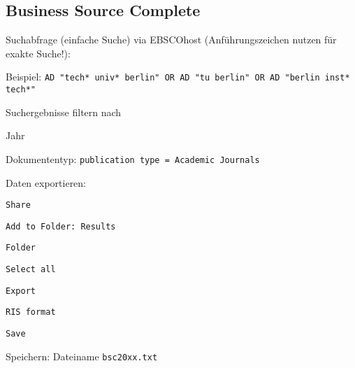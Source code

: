 \subsection*{Business Source Complete}
\begin{compactitem}
\item Suchabfrage (einfache Suche) via EBSCOhost (Anführungszeichen nutzen für exakte Suche!):
	\begin{compactitem}
	\item Beispiel: \texttt{AD "tech* univ* berlin"\ OR AD "tu berlin"\ OR AD "berlin \newline inst* tech*"}
	\end{compactitem}
\item Suchergebnisse filtern nach
	\begin{compactitem}
    \item Jahr
    \item Dokumententyp: \texttt{publication type = Academic Journals}
    \end{compactitem}
\item Daten exportieren: 
	\begin{compactitem}
	\item \texttt{Share}
    \item \texttt{Add to Folder: Results}
    \item \texttt{Folder}
    \item \texttt{Select all}
    \item \texttt{Export}
    \item \texttt{RIS format}
    \item \texttt{Save}
	\end{compactitem}
\item Speichern: Dateiname \texttt{bsc20xx.txt}
\end{compactitem}

